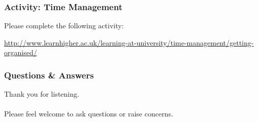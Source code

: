 \begin{frame}
	\frametitle{Activity: Time Management}
	
	Please complete the following activity:
	
	\vspace{2em}
	
	\url{http://www.learnhigher.ac.uk/learning-at-university/time-management/getting-organised/}

\end{frame}

\begin{frame}
	\frametitle{Questions \& Answers}	
	\begin{center}
		Thank you for listening. 
		\\~\\
		Please feel welcome to ask questions or raise concerns.
	\end{center}
\end{frame}


